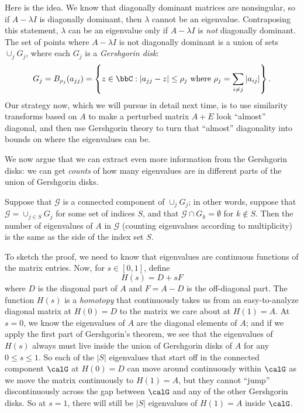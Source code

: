 \documentclass[12pt, leqno]{article} %
\begin{document}
Here is the idea.  We know that diagonally dominant matrices are nonsingular,
so if $A - \lambda I$ is diagonally dominant, then $\lambda$ cannot be an
eigenvalue.  Contraposing this statement, $\lambda$ can be an
eigenvalue only if $A - \lambda I$ is {\em not} diagonally dominant.
The set of points where $A - \lambda I$ is not diagonally dominant is
a union of sets $\cup_j G_j$, where each $G_j$ is a {\em Gershgorin disk}:
\[
  G_j = B_{\rho_j}(a_{jj}) =
  \left\{
    z \in \bbC : |a_{jj}-z| \leq \rho_j \mbox{ where }
    \rho_j = \sum_{i \neq j} |a_{ij}|
  \right\}.
\]
Our strategy now, which we will pursue in detail next time, is to use
similarity transforms based on $A$ to make a perturbed matrix $A+E$
look ``almost'' diagonal, and then use Gershgorin theory to turn that
``almost'' diagonality into bounds on where the eigenvalues can be.

We now argue that we can extract even more information from the
Gershgorin disks: we can get {\em counts} of how many eigenvalues
are in different parts of the union of Gershgorin disks.

Suppose that $\mathcal{G}$ is a connected component of $\cup_j G_j$;
in other words, suppose that $\mathcal{G} = \cup_{j \in S} G_j$ for
some set of indices $S$, and that $\mathcal{G} \cap G_k = \emptyset$
for $k \not \in S$.  Then the number of eigenvalues of $A$ in
$\mathcal{G}$ (counting eigenvalues according to multiplicity) is the
same as the side of the index set $S$.

To sketch the proof, we need to know that eigenvalues are continuous
functions of the matrix entries.  Now, for $s \in [0,1]$, define
\[
  H(s) = D + sF
\]
where $D$ is the diagonal part of $A$ and $F = A-D$ is the off-diagonal
part.  The function $H(s)$ is a {\em homotopy} that continuously takes
us from an easy-to-analyze diagonal matrix at $H(0) = D$ to the matrix
we care about at $H(1) = A$.  At $s = 0$, we know the eigenvalues of $A$
are the diagonal elements of $A$; and if we apply the first part of Gershgorin's
theorem, we see that the eigenvalues of $H(s)$ always must live inside
the union of Gershgorin disks of $A$ for any $0 \leq s \leq 1$.
So each of the $|S|$ eigenvalues that start off in the connected component
$\calG$ at $H(0) = D$ can move around continuously within $\calG$
as we move the matrix continuously to $H(1) = A$, but they cannot ``jump''
discontinuously across the gap between $\calG$ and any of the other Gershgorin
disks.  So at $s = 1$, there will still be $|S|$ eigenvalues of $H(1) = A$
inside $\calG$.
\end{document}
